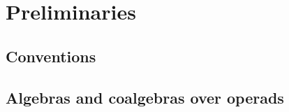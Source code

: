 
\section{Preliminaries} \label{s:preliminaries}

\subsection{Conventions}

\subsection{Algebras and coalgebras over operads}

